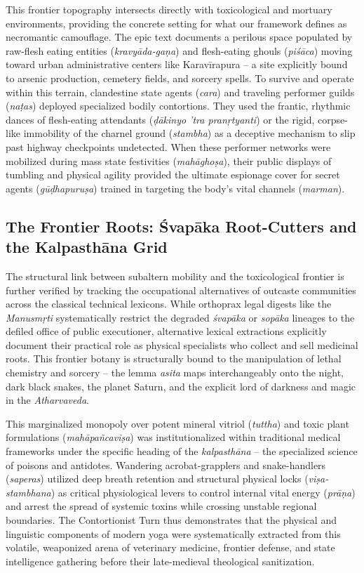 \documentclass[11pt,twoside,letterpaper]{article}
\begin{document}
This frontier topography intersects directly with toxicological and mortuary environments, providing the concrete setting for what our framework defines as necromantic camouflage. The epic text documents a perilous space populated by raw-flesh eating entities (\textit{kravyāda-gaṇa}) and flesh-eating ghouls (\textit{piśāca}) moving toward urban administrative centers like Karavīrapura -- a site explicitly bound to arsenic production, cemetery fields, and sorcery spells. To survive and operate within this terrain, clandestine state agents (\textit{cara}) and traveling performer guilds (\textit{naṭas}) deployed specialized bodily contortions. They used the frantic, rhythmic dances of flesh-eating attendants (\textit{ḍākinyo ’tra pranṛtyanti}) or the rigid, corpse-like immobility of the charnel ground (\textit{stambha}) as a deceptive mechanism to slip past highway checkpoints undetected. When these performer networks were mobilized during mass state festivities (\textit{mahāghoṣa}), their public displays of tumbling and physical agility provided the ultimate espionage cover for secret agents (\textit{gūḍhapuruṣa}) trained in targeting the body’s vital channels (\textit{marman}).

\subsection{The Frontier Roots: Śvapāka Root-Cutters and the Kalpasthāna Grid}

The structural link between subaltern mobility and the toxicological frontier is further verified by tracking the occupational alternatives of outcaste communities across the classical technical lexicons. While orthoprax legal digests like the \textit{Manusmṛti} systematically restrict the degraded \textit{śvapāka} or \textit{sopāka} lineages to the defiled office of public executioner, alternative lexical extractions explicitly document their practical role as physical specialists who collect and sell medicinal roots. This frontier botany is structurally bound to the manipulation of lethal chemistry and sorcery -- the lemma \textit{asita} maps interchangeably onto the night, dark black snakes, the planet Saturn, and the explicit lord of darkness and magic in the \textit{Atharvaveda}. 

This marginalized monopoly over potent mineral vitriol (\textit{tuttha}) and toxic plant formulations (\textit{mahāpañcaviṣa}) was institutionalized within traditional medical frameworks under the specific heading of the \textit{kalpasthāna} -- the specialized science of poisons and antidotes. Wandering acrobat-grapplers and snake-handlers (\textit{saperas}) utilized deep breath retention and structural physical locks (\textit{viṣa-stambhana}) as critical physiological levers to control internal vital energy (\textit{prāṇa}) and arrest the spread of systemic toxins while crossing unstable regional boundaries. The Contortionist Turn thus demonstrates that the physical and linguistic components of modern yoga were systematically extracted from this volatile, weaponized arena of veterinary medicine, frontier defense, and state intelligence gathering before their late-medieval theological sanitization.
\end{document}
